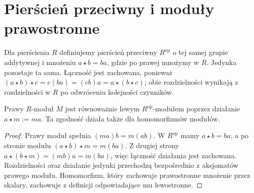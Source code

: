\section{Pierścień przeciwny i moduły prawostronne}
\begin{definicja}
\label{aa:def:nc-opposite}
Dla pierścienia $R$ definiujemy pierścień przeciwny
$R^{\mathrm{op}}$ o tej samej grupie addytywnej i
mnożeniu $a\star b=ba$, gdzie po prawej mnożymy w $R$.
Jedynka pozostaje ta sama. Łączność jest zachowana,
ponieważ $(a\star b)\star c=c(ba)=(cb)a=
a\star(b\star c)$; obie rozdzielności wynikają
z rozdzielności w $R$ po odwróceniu kolejności
czynników.
\end{definicja}
\begin{stwierdzenie}
\label{aa:st:nc-opposite-module}
Prawy $R$-moduł $M$ jest równoważnie lewym
$R^{\mathrm{op}}$-modułem poprzez działanie
$a\star m:=ma$. Ta zgodność działa także dla
homomorfizmów modułów.
\end{stwierdzenie}
\begin{proof}
Prawy moduł spełnia $(ma)b=m(ab)$.
W $R^{\mathrm{op}}$ mamy $a\star b=ba$,
a po stronie modułu
$(a\star b)\star m=m(ba)$.
Z drugiej strony
$a\star(b\star m)=(mb)a=m(ba)$, więc
łączność działania jest zachowana. Rozdzielności
oraz działanie jedynki przechodzą bezpośrednio
z aksjomatów prawego modułu. Homomorfizm, który
zachowuje prawostronne mnożenie przez skalary,
zachowuje z definicji odpowiadające mu lewostronne.
\end{proof}

